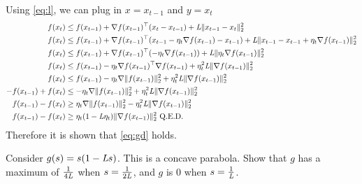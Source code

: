 \documentclass{exam}
\begin{document}
\begin{questions}
\begin{parts}
{            Using \eqref{eq:l}, we can plug in $x = x_{t - 1}$ and $y = x_t$
            \begin{align*}
                f(x_t)                  & \leq f(x_{t - 1}) + \nabla f(x_{t - 1})^\top (x_t - x_{t - 1}) + \emph{L}\Vert x_{t - 1} - x_t \Vert ^2_2                                                                       \\
                f(x_t)                  & \leq f(x_{t - 1}) + \nabla f(x_{t - 1})^\top (x_{t - 1} - \eta_t \nabla f(x_{t - 1}) - x_{t - 1}) + \emph{L}\Vert x_{t - 1} - x_{t - 1} + \eta_t \nabla f(x_{t - 1}) \Vert ^2_2 \\
                f(x_t)                  & \leq f(x_{t - 1}) + \nabla f(x_{t - 1})^\top (- \eta_t \nabla f(x_{t - 1})) + \emph{L}\Vert \eta_t \nabla f(x_{t - 1}) \Vert ^2_2                                               \\
                f(x_t)                  & \leq f(x_{t - 1}) - \eta_t \nabla f(x_{t - 1})^\top \nabla f(x_{t - 1}) +  \eta_t^2 \emph{L}\Vert \nabla f(x_{t - 1}) \Vert ^2_2                                                \\
                f(x_t)                  & \leq f(x_{t - 1}) - \eta_t \nabla \Vert f(x_{t - 1})\Vert ^2_2 + \eta_t^2 \emph{L}\Vert \nabla f(x_{t - 1}) \Vert ^2_2                                                          \\
                - f(x_{t - 1}) + f(x_t) & \leq  - \eta_t \nabla \Vert f(x_{t - 1})\Vert ^2_2 + \eta_t^2 \emph{L}\Vert \nabla f(x_{t - 1}) \Vert ^2_2                                                                      \\
                f(x_{t - 1}) - f(x_t)   & \geq  \eta_t \nabla \Vert f(x_{t - 1})\Vert ^2_2 - \eta_t^2 \emph{L}\Vert \nabla f(x_{t - 1}) \Vert ^2_2                                                                        \\
                f(x_{t - 1}) - f(x_t)   & \geq \eta_t(1 - \emph{L}\eta_t)\Vert \nabla f (x_{t - 1}) \Vert _2^2 \text{ Q.E.D.}
            \end{align*}
            Therefore it is shown that \eqref{eq:gd} holds.
        }

        \hr

        {
            Consider $g(s) = s(1 - \emph{L}s)$. This is a concave parabola. Show that $g$ has a maximum of $\frac{1}{4\emph{L}}$ when $s = \frac{1}{2\emph{L}}$, and $g$ is 0 when $s = \frac{1}{\emph{L}}$.

}
\end{parts}
\end{questions}
\end{document}
